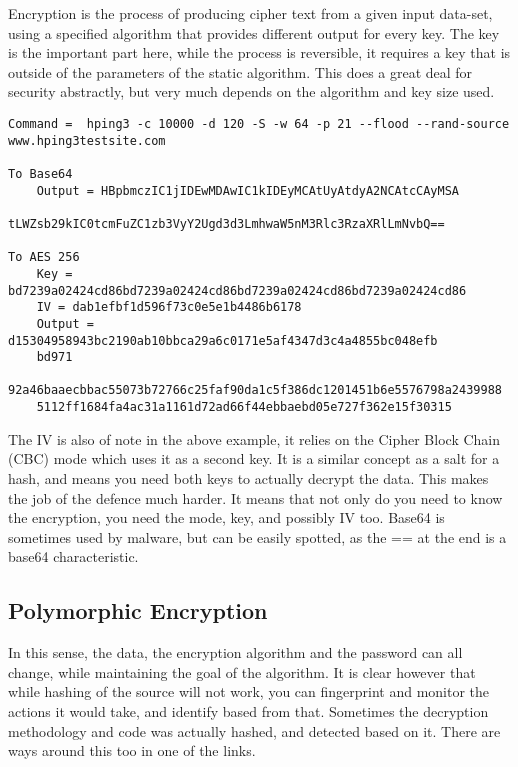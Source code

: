 Encryption is the process of producing cipher text from a given input data-set, using a specified algorithm that provides different output for every key. The key is the important part here,
while the process is reversible, it requires a key that is outside of the parameters of the static algorithm. This does a great deal for security abstractly, but very much depends on the algorithm and key size used.

\begin{lstlisting}[label=EncodingVsEncryption,caption=Encoding vs Encryption]
Command =  hping3 -c 10000 -d 120 -S -w 64 -p 21 --flood --rand-source www.hping3testsite.com

To Base64
    Output = HBpbmczIC1jIDEwMDAwIC1kIDEyMCAtUyAtdyA2NCAtcCAyMSA
             tLWZsb29kIC0tcmFuZC1zb3VyY2Ugd3d3LmhwaW5nM3Rlc3RzaXRlLmNvbQ==

To AES 256
    Key = bd7239a02424cd86bd7239a02424cd86bd7239a02424cd86bd7239a02424cd86
    IV = dab1efbf1d596f73c0e5e1b4486b6178
    Output = d15304958943bc2190ab10bbca29a6c0171e5af4347d3c4a4855bc048efb
    bd971
    92a46baaecbbac55073b72766c25faf90da1c5f386dc1201451b6e5576798a2439988
    5112ff1684fa4ac31a1161d72ad66f44ebbaebd05e727f362e15f30315

\end{lstlisting}


The IV is also of note in the above example, it relies on the Cipher Block Chain (CBC) mode which uses it as a second key. It is a similar concept as a salt for a hash, and means you need both keys to actually decrypt the data.
This makes the job of the defence much harder. It means that not only do you need to know the encryption, you need the mode, key, and possibly IV too. Base64 is sometimes used by malware, but can be easily spotted, as the ==
 at the end is a base64 characteristic.

\subsection{Polymorphic Encryption}
In this sense, the data, the encryption algorithm and the password can all change, while maintaining the goal of the algorithm.
It is clear however that while hashing of the source will not work, you can fingerprint and monitor the actions it would take, and identify based from that.
Sometimes the decryption methodology and code was actually hashed, and detected based on it. There are ways around this too in one of the links.

